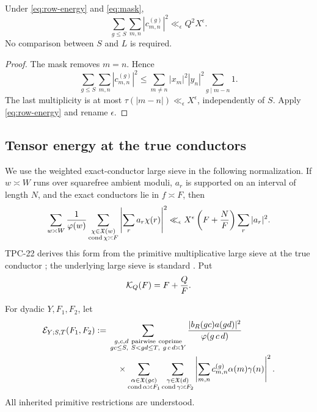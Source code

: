 \begin{lemma}
\label{lem:asymmetric-compatibility-energy}
Under \eqref{eq:row-energy} and \eqref{eq:mask},
\begin{equation}
 \boxed{
 \sum_{g\le S}\sum_{m,n}|c_{m,n}^{(g)}|^2
 \ll_\epsilon Q^2X^\epsilon.}
 \label{eq:asym-compatibility-energy}
\end{equation}
No comparison between \(S\) and \(L\) is required.
\end{lemma}

\begin{proof}
The mask removes \(m=n\).  Hence
\[
 \sum_{g\le S}\sum_{m,n}|c_{m,n}^{(g)}|^2
 \le
 \sum_{m\ne n}|x_m|^2|y_n|^2
 \sum_{g\mid m-n}1.
\]
The last multiplicity is at most
\(\tau(|m-n|)\ll_\epsilon X^\epsilon\), independently of \(S\).
Apply \eqref{eq:row-energy} and rename \(\epsilon\).
\end{proof}

\subsection{Tensor energy at the true conductors}

We use the weighted exact-conductor large sieve in the following
normalization.  If \(w\asymp W\) runs over squarefree ambient moduli,
\(a_r\) is supported on an interval of length \(N\), and the exact
conductors lie in \(f\asymp F\), then
\begin{equation}
 \sum_{w\asymp W}\frac1{\varphi(w)}
 \sum_{\substack{\chi\in\mathfrak X(w)\\\operatorname{cond}\chi\asymp F}}
 \left|\sum_ra_r\chi(r)\right|^2
 \ll_\epsilon X^\epsilon
 \left(F+\frac NF\right)\sum_r|a_r|^2.
 \label{eq:asym-exact-conductor-LS}
\end{equation}
TPC-22 derives this form from the primitive multiplicative large sieve
at the true conductor \citep{WangTPC22}; the underlying large sieve is
standard \citep[Chapter~7]{IwaniecKowalski2004}.  Put
\begin{equation}
 \mathcal K_Q(F)=F+\frac QF.
 \label{eq:asym-KQ}
\end{equation}

For dyadic \(Y,F_1,F_2\), let
\begin{align}
 \mathcal E_{Y;S,T}(F_1,F_2)
 :={}&
 \sum_{\substack{g,c,d\ \mathrm{pairwise\ coprime}\\
                  gc\le S,\ S<gd\le T,\ g\,c\,d\asymp Y}}
 \frac{|b_R(gc)a(gd)|^2}{\varphi(g\,c\,d)}
 \notag\\
 &\quad\times
 \sum_{\substack{\alpha\in\mathfrak X(gc)\\
                  \operatorname{cond}\alpha\asymp F_1}}
 \sum_{\substack{\gamma\in\mathfrak X(d)\\
                  \operatorname{cond}\gamma\asymp F_2}}
 \left|
 \sum_{m,n}c_{m,n}^{(g)}\alpha(m)\gamma(n)
 \right|^2.
 \label{eq:asymmetric-energy}
\end{align}
All inherited primitive restrictions are understood.

